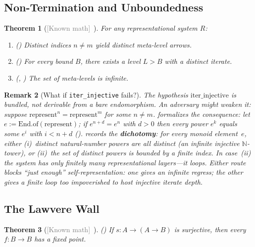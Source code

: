 \documentclass[11pt]{article}
\newtheorem{theorem}{Theorem}[section]
\newtheorem{remark}[theorem]{Remark}
\newcommand{\known}{\textcolor{gray}{[Known math]}}
\begin{document}
\subsection{Non-Termination and Unboundedness}

\begin{theorem}[\known\ ]
\label{thm:regress}
For any representational system $R$:
\begin{enumerate}[label=(\alph*)]
\item () Distinct indices $n \neq m$ yield distinct meta-level arrows.
\item () For every bound $B$, there exists a level $L > B$ with a distinct iterate.
\item (, ) The set of meta-levels is infinite.
\end{enumerate}
\end{theorem}

\begin{remark}[What if \texttt{iter\_injective} fails?]
\label{rem:dichotomy}
The hypothesis $\mathrm{iter\_injective}$ is \emph{bundled}, not derivable from
a bare endomorphism. An adversary might weaken it: suppose
$\mathrm{represent}^n = \mathrm{represent}^m$ for some $n \neq m$.
 formalizes the consequence: let
$e := \mathrm{End.of}(\mathrm{represent})$; if $e^{n+d}=e^n$ with $d>0$ then
every power $e^k$ equals some $e^i$ with $i < n+d$
().
records the \textbf{dichotomy}: for every monoid element~$e$, either
(i)~distinct natural-number powers are all distinct (an infinite injective
$\mathbb{N}$-tower), or (ii)~the set of \emph{distinct} powers is bounded by a
finite index.  In case~(ii) the system has only finitely many representational
layers---it loops.  Either route blocks ``just enough'' self-representation: one
gives an infinite regress; the other gives a finite loop too impoverished to
host injective iterate depth.
\end{remark}

\subsection{The Lawvere Wall}
\label{sec:lawvere}

\begin{theorem}[\known\ ]
\label{thm:lawvere}
() If $s : A \to (A \to B)$ is surjective, then every $f : B \to B$ has a fixed point.
\end{theorem}
\end{document}
